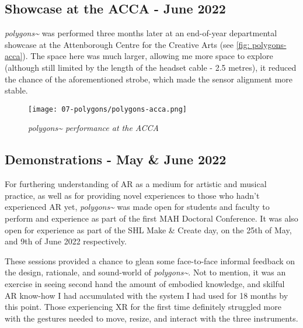 \subsection{Showcase at the ACCA - June 2022} \label{sec: polygons-performances-acca}
\textit{polygons\textasciitilde{}} was performed three months later at an end-of-year departmental showcase at the Attenborough Centre for the Creative Arts (see \autoref{fig: polygons-acca}). The space here was much larger, allowing me more space to explore (although still limited by the length of the headset cable - 2.5 metres), it reduced the chance of the aforementioned strobe, which made the sensor alignment more stable.

\begin{figure}
    \centering
    \texttt{[image: 07-polygons/polygons-acca.png]}
    \caption{\textit{polygons\textasciitilde{} performance at the ACCA}}
    \label{fig: polygons-acca}
\end{figure}

\subsection{Demonstrations - May \& June 2022} \label{sec: polygons-performances-demos}
For furthering understanding of AR as a medium for artistic and musical practice, as well as for providing novel experiences to those who hadn't experienced AR yet, \textit{polygons\textasciitilde{}} was made open for students and faculty to perform and experience as part of the first MAH Doctoral Conference. It was also open for experience as part of the SHL Make \& Create day, on the 25th of May, and 9th of June 2022 respectively.

These sessions provided a chance to glean some face-to-face informal feedback on the design, rationale, and sound-world of \textit{polygons\textasciitilde{}}. Not to mention, it was an exercise in seeing second hand the amount of embodied knowledge, and skilful AR know-how I had accumulated with the system I had used for 18 months by this point. Those experiencing XR for the first time definitely struggled more with the gestures needed to move, resize, and interact with the three instruments.



